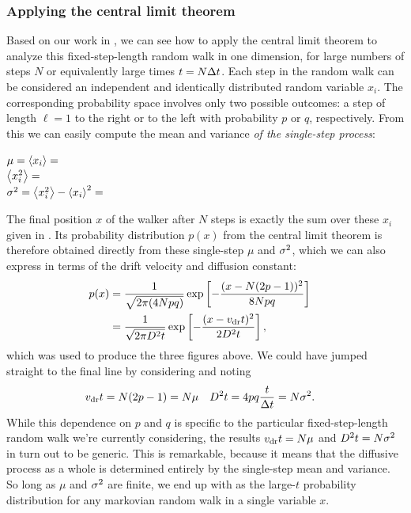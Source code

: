 \subsubsection{\label{sec:RW_CLT}Applying the central limit theorem}
Based on our work in , we can see how to apply the central limit theorem to analyze this fixed-step-length random walk in one dimension, for large numbers of steps $N$ or equivalently large times $t = N \Delta t$.
Each step in the random walk can be considered an independent and identically distributed random variable $x_i$.
The corresponding probability space involves only two possible outcomes: a step of length $\ell = 1$ to the right or to the left with probability $p$ or $q$, respectively.
From this we can easily compute the mean and variance \textit{of the single-step process}:
\begin{mdframed}
  $\mu = \left\langle x_i \right\rangle = $ \\[33 pt]
  $\left\langle x_i^2 \right\rangle = $ \\[33 pt]
  $\sigma^2 = \left\langle x_i^2 \right\rangle - \left\langle x_i \right\rangle^2 = $ \\[30 pt]
\end{mdframed}

The final position $x$ of the walker after $N$ steps is exactly the sum over these $x_i$ given in .
Its probability distribution $p(x)$ from the central limit theorem is therefore obtained directly from these single-step $\mu$ and $\sigma^2$, which we can also express in terms of the drift velocity and diffusion constant:
\begin{align}
  p(x) & = \frac{1}{\sqrt{2\pi (4Npq)}} \exp\left[-\frac{(x - N(2p - 1))^2}{8Npq}\right] \cr
       & = \frac{1}{\sqrt{2\pi D^2 t}} \exp\left[-\frac{(x - v_{\mathrm{dr}} t)^2}{2D^2 t}\right], \label{eq:RW_CLT}
\end{align}
which was used to produce the three figures above.
We could have jumped straight to the final line by considering  and noting
\begin{align}
  \label{eq:single_step}
  v_{\mathrm{dr}} t & = N(2p - 1) = N \mu &
  D^2 t & = 4pq \frac{t}{\Delta t} = N \sigma^2.
\end{align}
While this dependence on $p$ and $q$ is specific to the particular fixed-step-length random walk we're currently considering, the results $v_{\mathrm{dr}} t = N \mu$ and $D^2 t = N \sigma^2$ in  turn out to be generic.
This is remarkable, because it means that the diffusive process as a whole is determined entirely by the single-step mean and variance.
So long as $\mu$ and $\sigma^2$ are finite, we end up with  as the large-$t$ probability distribution for any markovian random walk in a single variable $x$.

